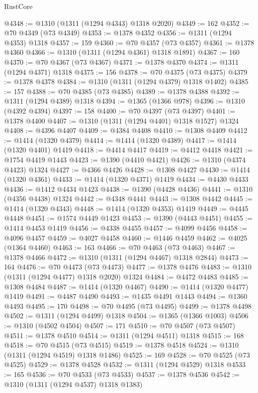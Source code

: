 \begin{lexlean}{RustCore}
\begin{coremodule}
@4348 := @1310 (@1311 (@1294 @4343) @1318 @2020)
@4349 := 162
@4352 := @70 @4349 (@73 @4349)
@4353 := @1378 @4352
@4356 := @1311 (@1294 @4353) @1318
@4357 := 159
@4360 := @70 @4357 (@73 @4357)
@4361 := @1378 @4360
@4366 := @1310 (@1311 (@1294 @4361) @1318 @1891)
@4367 := 160
@4370 := @70 @4367 (@73 @4367)
@4371 := @1378 @4370
@4374 := @1311 (@1294 @4371) @1318
@4375 := 156
@4378 := @70 @4375 (@73 @4375)
@4379 := @1378 @4378
@4384 := @1310 (@1311 (@1294 @4379) @1318 @1402)
@4385 := 157
@4388 := @70 @4385 (@73 @4385)
@4389 := @1378 @4388
@4392 := @1311 (@1294 @4389) @1318
@4394 := @1365 (@1366 @978)
@4396 := @1310 (@4392 @4394)
@4397 := 158
@4400 := @70 @4397 (@73 @4397)
@4401 := @1378 @4400
@4407 := @1310 (@1311 (@1294 @4401) @1318 @1527) @1324
@4408 := @4396 @4407
@4409 := @4384 @4408
@4410 := @1308 @4409
@4412 := @1414 (@1320 @4379)
@4414 := @1414 (@1320 @4389)
@4417 := @1414 (@1320 @4401) @1419
@4418 := @4414 @4417
@4419 := @4412 @4418
@4421 := @1754 @4419 @1443
@4423 := @1390 (@4410 @4421)
@4426 := @1310 (@4374 @4423) @1324
@4427 := @4366 @4426
@4428 := @1308 @4427
@4430 := @1414 (@1320 @4361)
@4433 := @1414 (@1320 @4371) @1419
@4434 := @4430 @4433
@4436 := @1412 @4434 @1423
@4438 := @1390 (@4428 @4436)
@4441 := @1310 (@4356 @4438) @1324
@4442 := @4348 @4441
@4443 := @1308 @4442
@4445 := @1414 (@1320 @4343)
@4448 := @1414 (@1320 @4353) @1419
@4449 := @4445 @4448
@4451 := @1574 @4449 @1423
@4453 := @1390 (@4443 @4451)
@4455 := @1414 @4453 @1419
@4456 := @4338 @4455
@4457 := @4099 @4456
@4458 := @4096 @4457
@4459 := @4027 @4458
@4460 := @1446 @4459
@4462 := @4025 (@1364 @4460)
@4463 := 163
@4466 := @70 @4463 (@73 @4463)
@4467 := @1378 @4466
@4472 := @1310 (@1311 (@1294 @4467) @1318 @2844)
@4473 := 164
@4476 := @70 @4473 (@73 @4473)
@4477 := @1378 @4476
@4483 := @1310 (@1311 (@1294 @4477) @1318 @2020) @1324
@4484 := @4472 @4483
@4485 := @1308 @4484
@4487 := @1414 (@1320 @4467)
@4490 := @1414 (@1320 @4477) @1419
@4491 := @4487 @4490
@4493 := @1435 @4491 @1443
@4494 := @1360 @4493
@4495 := 170
@4498 := @70 @4495 (@73 @4495)
@4499 := @1378 @4498
@4502 := @1311 (@1294 @4499) @1318
@4504 := @1365 (@1366 @1003)
@4506 := @1310 (@4502 @4504)
@4507 := 171
@4510 := @70 @4507 (@73 @4507)
@4511 := @1378 @4510
@4514 := @1311 (@1294 @4511) @1318
@4515 := 168
@4518 := @70 @4515 (@73 @4515)
@4519 := @1378 @4518
@4524 := @1310 (@1311 (@1294 @4519) @1318 @1486)
@4525 := 169
@4528 := @70 @4525 (@73 @4525)
@4529 := @1378 @4528
@4532 := @1311 (@1294 @4529) @1318
@4533 := 165
@4536 := @70 @4533 (@73 @4533)
@4537 := @1378 @4536
@4542 := @1310 (@1311 (@1294 @4537) @1318 @1383)

\end{coremodule}
\end{lexlean}
